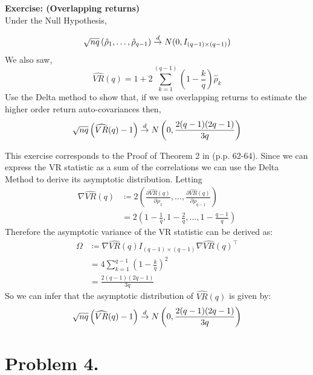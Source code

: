 \documentclass[12pt,twoside]{article}
\begin{document}
\textbf{Exercise: (Overlapping returns)} \\

Under the Null Hypothesis,

\[
    \sqrt{nq}\left(\hat\rho_1, \dots, \hat\rho_{q-1}\right) \overset{d}{\rightarrow} N(0,I_{(q-1)\times (q-1)})
\]
We also saw,
\[
    \widehat{VR}(q) = 1+2\sum_{k=1}^{(q-1)} \left(1-\frac{k}{q}\right)\hat\rho_k
\]
Use the Delta method to show that, if we use overlapping returns to estimate the higher order return auto-covariances then,
\[
    \sqrt{nq}\left(\widehat{VR}(q)-1\right) \overset{d}{\rightarrow} N\left(0,\frac{2(q-1)(2q-1)}{3q}\right)
\]
\begin{solution}
    This exercise corresponds to the Proof of Theorem 2 in \citet{lo1988stock} (p.p. 62-64).
    Since we can express the VR statistic as a sum of the correlations we can use the Delta Method to derive its asymptotic distribution. Letting
    \begin{align*}
        \nabla \widehat{VR}(q) & \coloneqq 2\left(\frac{\partial\widehat{VR}(q)}{\partial \rho_1}, \dots, \frac{\partial\widehat{VR}(q)}{\partial \rho_{q-1}} \right) \\
        & = 2\left(1-\frac{1}{q}, 1-\frac{2}{q}, \dots, 1-\frac{q-1}{q}\right)
    \end{align*}
    Therefore the asymptotic variance of the VR statistic can be derived as:
    \begin{align*}
        \Omega & \coloneqq \nabla\widehat{VR}(q) I_{(q-1)\times (q-1)}\nabla\widehat{VR}(q)^\intercal \\
        & = 4\sum_{k=1}^{q-1} \left(1-\frac{k}{q}\right)^2 \\
        & = \frac{2(q-1)(2q-1)}{3q}
    \end{align*}
    So we can infer that the asymptotic distribution of \(\widehat{VR}(q)\) is given by:
    \[
        \sqrt{nq}\left(\widehat{VR}(q)-1\right) \overset{d}{\rightarrow} N\left(0, \frac{2(q-1)(2q-1)}{3q}\right)
    \]
\end{solution}

\newpage

\section{Problem 4.}
\end{document}

